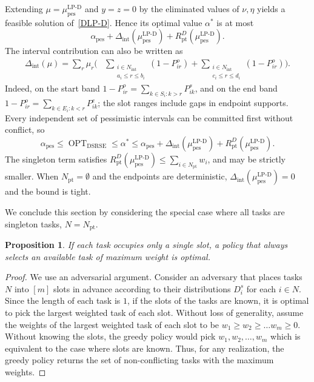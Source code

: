 \documentclass{article}
\newtheorem{proposition}[theorem]{Proposition}
\DeclareMathOperator{\pes}{pes}
\begin{document}
{Extending $\mu=\mu^{\operatorname{LP-D}}_{\pes}$ and $y=z=0$ by the eliminated values of $\nu,\eta$ yields a feasible solution of~\eqref{DLP-D}. Hence its optimal value $\alpha^*$ is at most
\[
\alpha_{\pes}+\Delta_{\mathrm{int}}(\mu^{\operatorname{LP-D}}_{\pes})+R_{\mathrm{pt}}^D(\mu^{\operatorname{LP-D}}_{\pes}).
\]
The interval contribution can also be written as
\begin{align*}
\Delta_{\mathrm{int}}(\mu)
 =\sum_r\mu_r\biggl(&\sum_{\substack{i\in N_{\mathrm{int}}\\a_i\leq r\leq b_i}}(1-P_{ir}^o)
 +\sum_{\substack{i\in N_{\mathrm{int}}\\c_i\leq r\leq d_i}}(1-P_{ir}^o)\biggr).
\end{align*}
Indeed, on the start band $1-P_{ir}^o=\sum_{k\in S_i:k>r}P_{ik}^s$, and on the end band $1-P_{ir}^o=\sum_{k\in E_i:k<r}P_{ik}^e$; the slot ranges include gaps in endpoint supports. Every independent set of pessimistic intervals can be committed first without conflict, so
\[
\alpha_{\pes}\leq\operatorname{OPT}_{\operatorname{DSRSE}}\leq\alpha^*
\leq\alpha_{\pes}+\Delta_{\mathrm{int}}(\mu^{\operatorname{LP-D}}_{\pes})+R_{\mathrm{pt}}^D(\mu^{\operatorname{LP-D}}_{\pes}).
\]
The singleton term satisfies $R_{\mathrm{pt}}^D(\mu^{\operatorname{LP-D}}_{\pes})\leq\sum_{i\in N_{\mathrm{pt}}}w_i$, and may be strictly smaller. When $N_{\mathrm{pt}}=\emptyset$ and the endpoints are deterministic, $\Delta_{\mathrm{int}}(\mu^{\operatorname{LP-D}}_{\pes})=0$ and the bound is tight.}

We conclude this section by considering the special case where {all tasks are singleton tasks, $N=N_{\mathrm{pt}}$}.

\begin{proposition}
    If each task occupies only a single slot, {a policy that always selects an available task of maximum weight is optimal.}
\end{proposition}
\begin{proof}
    We use an adversarial argument.
    Consider an adversary that places tasks $N$ into $[m]$ {slots} in advance according to their {distributions $D_i^s$ }for each $i\in N$.
    Since the length of each task is $1$, if the {slots} of the tasks are known, it is optimal to pick the largest weighted task of each {slot}.
    Without loss of generality, assume the weights of the largest weighted task of each {slot} to be $w_1\geq w_2\geq \ldots w_m\geq 0$.
    Without knowing the {slots}, the greedy policy would pick $w_1,w_2,\ldots, w_m$ which is equivalent to the case where {slots} are known.
    Thus, for any realization, the greedy policy returns the set of non-conflicting tasks with the maximum weights.
\end{proof}
\end{document}
